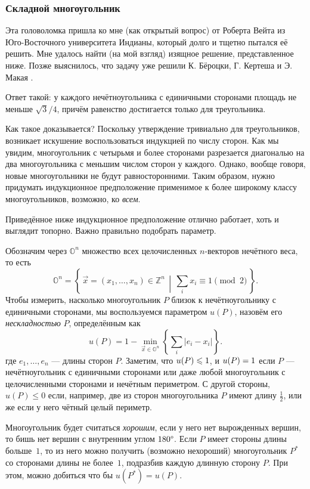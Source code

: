 \subsubsection*{Складной многоугольник}

Эта головоломка пришла ко мне (как открытый вопрос) от Роберта Вейта из Юго-Восточного университета Индианы, который долго и тщетно пытался её решить.
Мне удалось найти (на мой взгляд) изящное решение, представленное ниже.
Позже выяснилось, что задачу уже решили К. Бёроцки, Г. Кертеша и Э. Макая \cite{9}.

Ответ такой: у каждого нечётноугольника с единичными сторонами площадь не меньше $\sqrt{3}/4$, причём равенство достигается только для треугольника.

Как такое доказывается?
Поскольку утверждение тривиально для треугольников, возникает искушение воспользоваться индукцией по числу сторон.
Как мы увидим,  многоугольник с четырьмя и более сторонами разрезается диагональю на два многоугольника с меньшим числом сторон у каждого.
Однако, вообще говоря, новые многоугольники не будут равносторонними.
Таким образом, нужно придумать индукционное предположение применимое к более широкому классу многоугольников, возможно, ко \emph{всем}.

Приведённое ниже индукционное предположение отлично работает, хоть и выглядит топорно. Важно правильно подобрать параметр.

Обозначим через $\mathbb{O}^n$ множество всех целочисленных $n$-векторов нечётного веса, то есть 
\[\mathbb{O}^n=\left\{\,\vec x=(x_1,\dots,x_n)\in \mathbb{Z}^n\,\middle|\, \sum_ix_i\equiv 1\pmod 2\,\right\}.\]
Чтобы измерить, насколько многоугольник $P$ близок к нечётноугольнику с единичными сторонами, мы воспользуемся параметром $u(P)$, назовём его \emph{нескладностью} $P$, определённым как
\[u(P)=1-\min_{\vec x\in \mathbb{O}^n} \left\{\sum_i |e_i-x_i|\right\}.\]
где  $e_1,\dots,e_n$ --- длины сторон $P$.
Заметим, что $u(P)\z\leqslant1$, и $u(P)\z=1$ если $P$ --- нечётноугольник с единичными сторонами или даже любой многоугольник с целочисленными сторонами и нечётным периметром.
С другой стороны, $u(P)\leqslant 0$ если, например, две из сторон многоугольника $P$ имеют длину $\tfrac12$, или же если у него чётный целый периметр.

Многоугольник будет считаться \emph{хорошим}, если у него нет вырожденных вершин, то бишь нет вершин с внутренним углом $180\degree$.
Если $P$ имеет стороны длины больше~$1$, то из него можно получить (возможно нехороший) многоугольник $P^*$ со сторонами длины не более~$1$, подразбив каждую длинную сторону $P$.
При этом, можно добиться что бы $u(P^*)=u(P)$.

